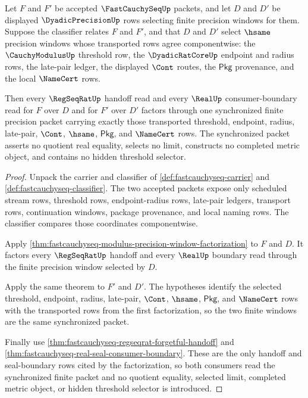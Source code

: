 \begin{theorem}
\label{thm:fastcauchyseq-synchronized-precision-window}
Let $F$ and $F'$ be accepted $\FastCauchySeqUp$ packets, and let $D$ and $D'$
be displayed $\DyadicPrecisionUp$ rows selecting finite precision windows for
them. Suppose the classifier relates $F$ and $F'$, and that $D$ and $D'$ select
$\hsame$ precision windows whose transported rows agree componentwise: the
$\CauchyModulusUp$ threshold row, the $\DyadicRatCoreUp$ endpoint and radius
rows, the late-pair ledger, the displayed $\Cont$ routes, the $\mathsf{Pkg}$
provenance, and the local $\NameCert$ rows.

Then every $\RegSeqRatUp$ handoff read and every $\RealUp$ consumer-boundary
read for $F$ over $D$ and for $F'$ over $D'$ factors through one synchronized
finite precision packet carrying exactly those transported threshold,
endpoint, radius, late-pair, $\Cont$, $\hsame$, $\mathsf{Pkg}$, and
$\NameCert$ rows. The synchronized packet asserts no quotient real equality,
selects no limit, constructs no completed metric object, and contains no hidden
threshold selector.
\end{theorem}
\begin{proof}
Unpack the carrier and classifier of
\autoref{def:fastcauchyseq-carrier} and
\autoref{def:fastcauchyseq-classifier}. The two accepted packets expose only
scheduled stream rows, threshold rows, endpoint-radius rows, late-pair ledgers,
transport rows, continuation windows, package provenance, and local naming
rows. The classifier compares those coordinates componentwise.

Apply
\autoref{thm:fastcauchyseq-modulus-precision-window-factorization} to $F$ and
$D$. It factors every $\RegSeqRatUp$ handoff and every $\RealUp$ boundary read
through the finite precision window selected by $D$.

Apply the same theorem to $F'$ and $D'$. The hypotheses identify the selected
threshold, endpoint, radius, late-pair, $\Cont$, $\hsame$, $\mathsf{Pkg}$, and
$\NameCert$ rows with the transported rows from the first factorization, so the
two finite windows are the same synchronized packet.

Finally use
\autoref{thm:fastcauchyseq-regseqrat-forgetful-handoff} and
\autoref{thm:fastcauchyseq-real-seal-consumer-boundary}. These are the only
handoff and seal-boundary rows cited by the factorization, so both consumers
read the synchronized finite packet and no quotient equality, selected limit,
completed metric object, or hidden threshold selector is introduced.
\end{proof}


